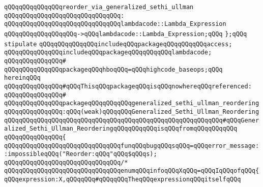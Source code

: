 \verb|qQQqqQQqqQQqqQQqreorder_via_generalized_sethi_ullman|\newline
\verb|qQQqqQQqqQQqqQQqqQQqqQQqqQQqqQQq:|\newline
\verb|qQQqqQQqqQQqqQQqqQQqqQQqqQQqqQQqlambdacode::Lambda_Expression|\newline
\verb|qQQqqQQqqQQqqQQqqQQq->qQQqlambdacode::Lambda_Expression;qQQq|\newline
\verb|};qQQq|\newline
\newline
\newline
\newline
\verb|stipulate|\newline
\verb|qQQqqQQqqQQqqQQqincludeqQQqpackageqQQqqQQqqQQqaccess;|\newline
\verb|qQQqqQQqqQQqqQQqincludeqQQqpackageqQQqqQQqqQQqlambdacode;|\newline
\verb|qQQqqQQqqQQqqQQq#|\newline
\verb|qQQqqQQqqQQqqQQqpackageqQQqhboqQQq=qQQqhighcode_baseops;qQQq|\newline
\verb|hereinqQQq|\newline
\newline
\verb|qQQqqQQqqQQqqQQq#qQQqThisqQQqpackageqQQqisqQQqnowhereqQQqreferenced:|\newline
\verb|qQQqqQQqqQQqqQQq#|\newline
\verb|qQQqqQQqqQQqqQQqpackageqQQqqQQqqQQqgeneralized_sethi_ullman_reordering|\newline
\verb|qQQqqQQqqQQqqQQq:qQQq(weak)qQQqqQQqGeneralized_Sethi_Ullman_ReorderingqQQqqQQqqQQqqQQqqQQqqQQqqQQqqQQqqQQqqQQqqQQqqQQqqQQqqQQqqQQq#qQQqGeneralized_Sethi_Ullman_ReorderingqQQqqQQqqQQqisqQQqfromqQQqqQQqqQQq|\newline
\verb|qQQqqQQqqQQqqQQq{|\newline
\newline
\verb|qQQqqQQqqQQqqQQqqQQqqQQqqQQqqQQqfunqQQqbugqQQqsqQQq=qQQqerror_message::impossibleqQQq("Reorder:qQQq"qQQq$qQQqs);|\newline
\newline
\verb|qQQqqQQqqQQqqQQqqQQqqQQqqQQqqQQq/*|\newline
\verb|qQQqqQQqqQQqqQQqqQQqqQQqqQQqqQQqenumqQQqinfoqQQqXqQQq=qQQqIqQQqofqQQq{qQQqexpression:X,qQQqqQQq#qQQqqQQqTheqQQqexpressionqQQqitselfqQQq|\newline
